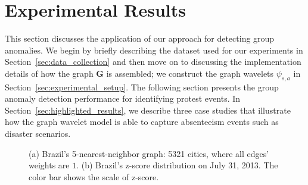 \section{Experimental Results}
\label{sec:experiment}
This section discusses the application of our approach for detecting group anomalies. We begin by briefly describing the dataset used for our experiments in Section~\ref{sec:data_collection} and then move on to discussing the implementation details of how the graph $\mathbf{G}$ is assembled; we construct the graph wavelets $\psi_{s,a}$ in Section~\ref{sec:experimental_setup}. The following section presents the group anomaly detection performance for identifying protest events. In Section~\ref{sec:highlighted_results}, we describe three case studies that illustrate how the graph wavelet model is able to capture absenteeism events such as disaster scenarios.

\begin{figure}[t]
	\centering
	\caption{(a) Brazil's 5-nearest-neighbor graph: 5321 cities, where all edges' weights are $1$. (b) Brazil's z-score distribution on July 31, 2013. The color bar shows the scale of z-score.}
	\label{fig:knn_zscore}
\end{figure}


